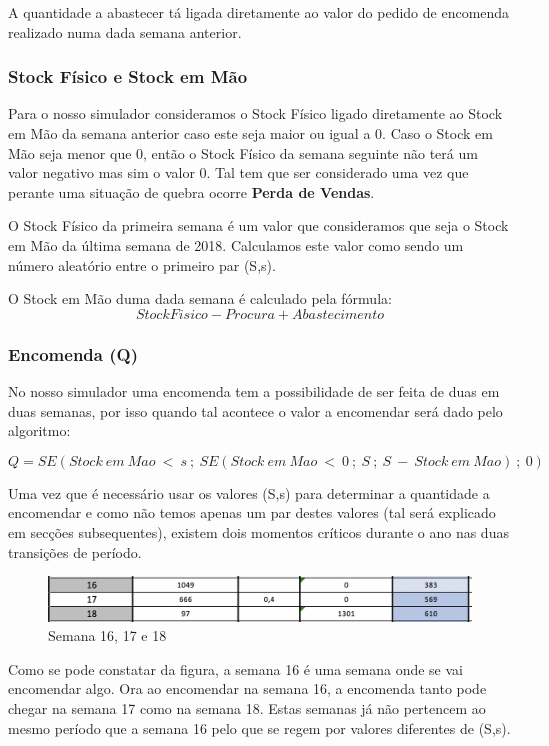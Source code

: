 \documentclass[a4paper]{article}
\begin{document}
A quantidade a abastecer tá ligada diretamente ao valor do pedido de encomenda realizado numa dada semana anterior.


\subsubsection{Stock Físico e Stock em Mão}

Para o nosso simulador consideramos o Stock Físico ligado diretamente ao Stock em Mão da semana anterior caso este seja maior ou igual a 0. Caso o Stock em Mão seja menor que 0, então o Stock Físico da semana seguinte não terá um valor negativo mas sim o valor 0. Tal tem que ser considerado uma vez que perante uma situação de quebra ocorre \textbf{Perda de Vendas}.

O Stock Físico da primeira semana é um valor que consideramos que seja o Stock em Mão da última semana de 2018. Calculamos este valor como sendo um número aleatório entre o primeiro par (S,s).

O Stock em Mão duma dada semana é calculado pela fórmula: $$ StockFisico - Procura + Abastecimento $$


\subsubsection{Encomenda (Q)}

No nosso simulador uma encomenda tem a possibilidade de ser feita de duas em duas semanas, por isso quando tal acontece o valor a encomendar será dado pelo algoritmo:

 $$ Q = SE(Stock\ em\ Mao\ <\ s\ ;\ SE(Stock\ em\ Mao\ <\ 0\ ;\ S\ ;\ S\ -\ Stock\ em\ Mao)\ ;\ 0 ) $$
 
 Uma vez que é necessário usar os valores (S,s) para determinar a quantidade a encomendar e como não temos apenas um par destes valores (tal será explicado em secções subsequentes), existem dois momentos críticos durante o ano nas duas transições de período.
 
\begin{figure}[H]
\centering
\includegraphics[scale=0.6]{periodo_critico.png}
\caption{Semana 16, 17 e 18}
\label{img:periodo_critico}
\end{figure}

Como se pode constatar da figura, a semana 16 é uma semana onde se vai encomendar algo. Ora ao encomendar na semana 16, a encomenda tanto pode chegar na semana 17 como na semana 18. Estas semanas já não pertencem ao mesmo período que a semana 16 pelo que se regem por valores diferentes de (S,s).
\end{document}
